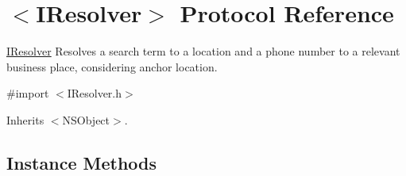 \hypertarget{protocol_i_resolver-p}{}\section{$<$I\+Resolver$>$ Protocol Reference}
\label{protocol_i_resolver-p}


\hyperlink{protocol_i_resolver-p}{I\+Resolver} Resolves a search term to a location and a phone number to a relevant business place, considering anchor location.  




{\ttfamily \#import $<$I\+Resolver.\+h$>$}



Inherits $<$\+N\+S\+Object$>$.

\subsection*{Instance Methods}
